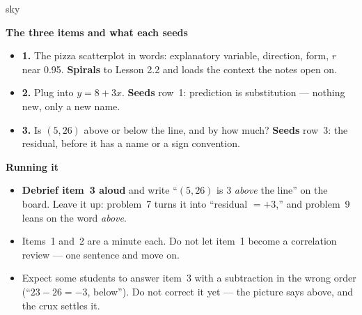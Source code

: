 \documentclass[10pt]{article}
\begin{document}
\boxguard[20]
\begin{skillbox}{sky}
\begin{minipage}[t]{0.48\linewidth}
    \textbf{The three items and what each seeds}
    \begin{itemize}
        \item \textbf{1.} The pizza scatterplot in words: explanatory variable, direction,
              form, $r$ near 0.95. \textbf{Spirals} to Lesson 2.2 and loads the context the
              notes open on.
        \item \textbf{2.} Plug into $y = 8 + 3x$. \textbf{Seeds} row~1: prediction is
              substitution --- nothing new, only a new name.
        \item \textbf{3.} Is $(5, 26)$ above or below the line, and by how much?
              \textbf{Seeds} row~3: the residual, before it has a name or a sign convention.
    \end{itemize}
\end{minipage}
\hfill
\begin{minipage}[t]{0.48\linewidth}
    \textbf{Running it}
    \begin{itemize}
        \item \textbf{Debrief item~3 aloud} and write ``$(5,26)$ is 3 \emph{above} the line''
              on the board. Leave it up: problem~7 turns it into ``residual $= +3$,'' and
              problem~9 leans on the word \emph{above}.
        \item Items~1 and~2 are a minute each. Do not let item~1 become a correlation review
              --- one sentence and move on.
        \item Expect some students to answer item~3 with a subtraction in the wrong order
              (``$23 - 26 = -3$, below''). Do not correct it yet --- the picture says above,
              and the crux settles it.
    \end{itemize}
\end{minipage}
\end{skillbox}
\end{document}
